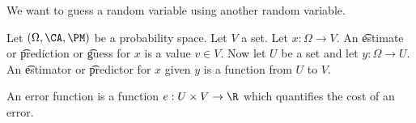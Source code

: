 

We want to guess a random variable using another random variable.


Let $(\Omega, \CA, \PM)$ be a probability space.
Let $V$ a set.
Let $x: \Omega \to V$.
An \t{estimate} or \t{prediction} or \t{guess} for $x$ is a value $v \in V$.
Now let $U$ be a set and let $y: \Omega \to U$.
An \t{estimator} or \t{predictor} for $x$ given $y$ is a function from $U$ to $V$.


An error function is a function $e: U \times V \to \R$ which quantifies the cost of an error.




\blankpage
